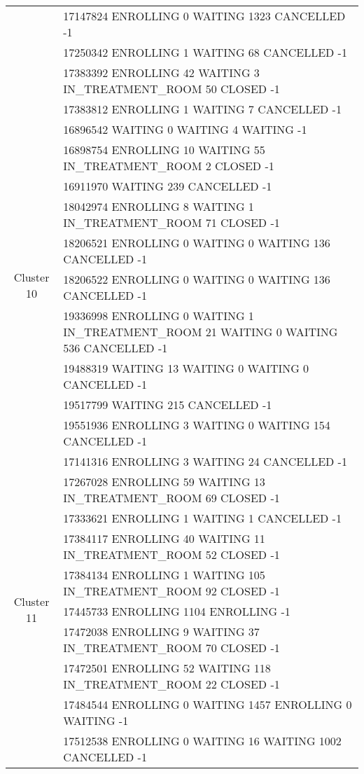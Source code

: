 {\begin{longtable}{|c|p{}|}
		& 17147824 ENROLLING 0 WAITING 1323 CANCELLED -1 \\
		& 17250342 ENROLLING 1 WAITING 68 CANCELLED -1 \\
		& 17383392 ENROLLING 42 WAITING 3 IN\_TREATMENT\_ROOM 50 CLOSED -1 \\
		& 17383812 ENROLLING 1 WAITING 7 CANCELLED -1 \\
		\hline
		\multirow{10}{*}{Cluster 10}
		& 16896542 WAITING 0 WAITING 4 WAITING -1 \\
		& 16898754 ENROLLING 10 WAITING 55 IN\_TREATMENT\_ROOM 2 CLOSED -1 \\
		& 16911970 WAITING 239 CANCELLED -1 \\
		& 18042974 ENROLLING 8 WAITING 1 IN\_TREATMENT\_ROOM 71 CLOSED -1 \\
		& 18206521 ENROLLING 0 WAITING 0 WAITING 136 CANCELLED -1 \\
		& 18206522 ENROLLING 0 WAITING 0 WAITING 136 CANCELLED -1 \\
		& 19336998 ENROLLING 0 WAITING 1 IN\_TREATMENT\_ROOM 21 WAITING 0 WAITING 536 CANCELLED -1 \\
		& 19488319 WAITING 13 WAITING 0 WAITING 0 CANCELLED -1 \\
		& 19517799 WAITING 215 CANCELLED -1 \\
		& 19551936 ENROLLING 3 WAITING 0 WAITING 154 CANCELLED -1 \\
		\hline
		\multirow{10}{*}{Cluster 11}
		& 17141316 ENROLLING 3 WAITING 24 CANCELLED -1 \\
		& 17267028 ENROLLING 59 WAITING 13 IN\_TREATMENT\_ROOM 69 CLOSED -1 \\
		& 17333621 ENROLLING 1 WAITING 1 CANCELLED -1 \\
		& 17384117 ENROLLING 40 WAITING 11 IN\_TREATMENT\_ROOM 52 CLOSED -1 \\
		& 17384134 ENROLLING 1 WAITING 105 IN\_TREATMENT\_ROOM 92 CLOSED -1 \\
		& 17445733 ENROLLING 1104 ENROLLING -1 \\
		& 17472038 ENROLLING 9 WAITING 37 IN\_TREATMENT\_ROOM 70 CLOSED -1 \\
		& 17472501 ENROLLING 52 WAITING 118 IN\_TREATMENT\_ROOM 22 CLOSED -1 \\
		& 17484544 ENROLLING 0 WAITING 1457 ENROLLING 0 WAITING -1 \\
		& 17512538 ENROLLING 0 WAITING 16 WAITING 1002 CANCELLED -1 \\
		\hline
\end{longtable}
}

